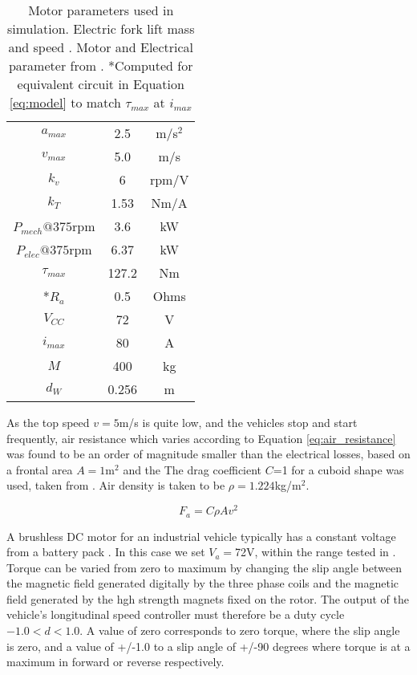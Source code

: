 \begin{table}
	\caption{Motor parameters used in simulation. Electric fork lift mass and speed \cite{Hyster2020a}. Motor and Electrical parameter from \cite{Racewicz2018}. *Computed for equivalent circuit in Equation \ref{eq:model} to match $\tau_{max}$ at $i_{max}$ }
	\label{tab:motor_params} 
	\centering
	\begin{tabular}{ |c|c|c| }
		\hline
		$a_{max}$ & 2.5 & m/s$^2$\\
		$v_{max}$ & 5.0& m/s \\
		$k_v$ & 6 & rpm/V\\ 
		$k_T$ & 1.53 & Nm/A\\ 
		$P_{mech}@375$rpm & 3.6 & kW\\ 
		$P_{elec}@375$rpm & 6.37 & kW \\
		$\tau_{max}$ & 127.2 & Nm\\
		*$R_a$ & 0.5 & Ohms\\
		$V_{CC}$ & 72 & V\\
		$i_{max}$ & 80 & A\\
		$M$ & 400 & kg\\
		$d_W$ & 0.256 & m\\
		\hline
	\end{tabular}
\end{table}

As the top speed $v=5$m/s is quite low, and the vehicles stop and start frequently, air resistance which varies according to Equation \ref{eq:air_resistance} was found to be an order of magnitude smaller than the electrical losses, based on a frontal area $A=1$m$^2$ and the The drag coefficient $C$=1 for a cuboid shape was used, taken from \cite{Toolbox2004}. Air density is taken to be $\rho=1.224$kg/m$^2$.

\begin{equation}
	F_a = C\rho A v^2 
	\label{eq:air_resistance}
\end{equation}

A brushless DC motor for an industrial vehicle typically has a constant voltage from a battery pack \cite{Hyster2020a}. In this case we set $V_a=$72V, within the range tested in \cite{Racewicz2018}. Torque can be varied from zero to maximum by changing the slip angle between the magnetic field generated digitally by the three phase coils and the magnetic field generated by the hgh strength magnets fixed on  the rotor. The output of the vehicle's longitudinal speed controller must therefore be a duty cycle $-1.0<d<1.0$. A value of zero corresponds to zero torque, where the slip angle is zero, and a value of +/-1.0 to a slip angle of +/-90 degrees where torque is at a maximum in forward or reverse respectively.



